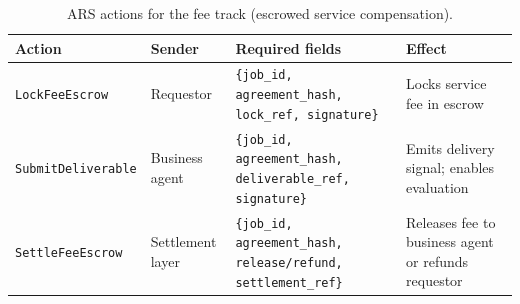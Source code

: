 \begin{table}[!ht]
\centering
\small
\setlength{\tabcolsep}{6pt}
\renewcommand{\arraystretch}{1.25}
\begin{tabular}{p{3.3cm}p{2.2cm}p{4.4cm}p{3.5cm}}
\hline
\textbf{Action} & \textbf{Sender} & \textbf{Required fields} & \textbf{Effect} \\
\hline
\texttt{LockFeeEscrow} & Requestor &
\texttt{\{job\_id, agreement\_hash, lock\_ref, signature\}} &
Locks service fee in escrow \\
\texttt{SubmitDeliverable} & Business agent &
\texttt{\{job\_id, agreement\_hash, deliverable\_ref, signature\}} &
Emits delivery signal; enables evaluation \\
\texttt{SettleFeeEscrow} & Settlement layer &
\texttt{\{job\_id, agreement\_hash, release/refund, settlement\_ref\}} &
Releases fee to business agent or refunds requestor \\
\hline
\end{tabular}
\caption{\textsc{ARS} actions for the fee track (escrowed service compensation).}
\label{tab:arp-actions-fee}
\end{table}